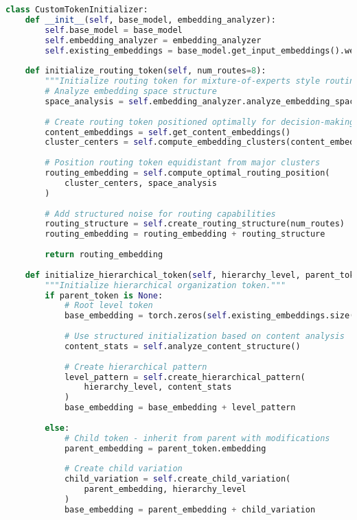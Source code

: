 \begin{lstlisting}[language=Python, caption=Advanced embedding initialization strategies]
class CustomTokenInitializer:
    def __init__(self, base_model, embedding_analyzer):
        self.base_model = base_model
        self.embedding_analyzer = embedding_analyzer
        self.existing_embeddings = base_model.get_input_embeddings().weight
        
    def initialize_routing_token(self, num_routes=8):
        """Initialize routing token for mixture-of-experts style routing."""
        # Analyze embedding space structure
        space_analysis = self.embedding_analyzer.analyze_embedding_space()
        
        # Create routing token positioned optimally for decision-making
        content_embeddings = self.get_content_embeddings()
        cluster_centers = self.compute_embedding_clusters(content_embeddings)
        
        # Position routing token equidistant from major clusters
        routing_embedding = self.compute_optimal_routing_position(
            cluster_centers, space_analysis
        )
        
        # Add structured noise for routing capabilities
        routing_structure = self.create_routing_structure(num_routes)
        routing_embedding = routing_embedding + routing_structure
        
        return routing_embedding
    
    def initialize_hierarchical_token(self, hierarchy_level, parent_token=None):
        """Initialize hierarchical organization token."""
        if parent_token is None:
            # Root level token
            base_embedding = torch.zeros(self.existing_embeddings.size(1))
            
            # Use structured initialization based on content analysis
            content_stats = self.analyze_content_structure()
            
            # Create hierarchical pattern
            level_pattern = self.create_hierarchical_pattern(
                hierarchy_level, content_stats
            )
            base_embedding = base_embedding + level_pattern
            
        else:
            # Child token - inherit from parent with modifications
            parent_embedding = parent_token.embedding
            
            # Create child variation
            child_variation = self.create_child_variation(
                parent_embedding, hierarchy_level
            )
            base_embedding = parent_embedding + child_variation
        

\end{lstlisting}
